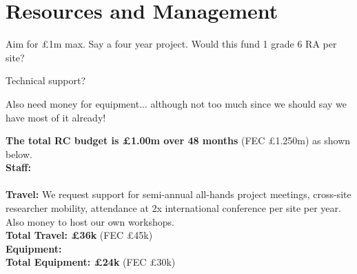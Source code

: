 \documentclass[a4paper,11pt]{article}
\begin{document}
\section{Resources and Management}

Aim for \pounds 1m max.
Say a four year project. Would this fund 1 grade 6 RA per site?

Technical support?

Also need money for equipment... although not too much since we should say we have most of it already!




\textbf{The total RC budget is \pounds 1.00m over 48 months} (FEC \pounds 1.250m) as shown below.
\\
\textbf{Staff:} 
\\
\\
\textbf{Travel:}
We request support for semi-annual all-hands project meetings,
cross-site researcher mobility,
attendance at 2x international conference per site per year.
Also money to host our own workshops.
\\
\textbf{Total Travel: \pounds 36k} (FEC \pounds 45k)\vspace{1mm}
\\
\textbf{Equipment:}
\\
\textbf{Total Equipment: \pounds 24k} (FEC \pounds 30k)
\\



{\small


}
\end{document}
